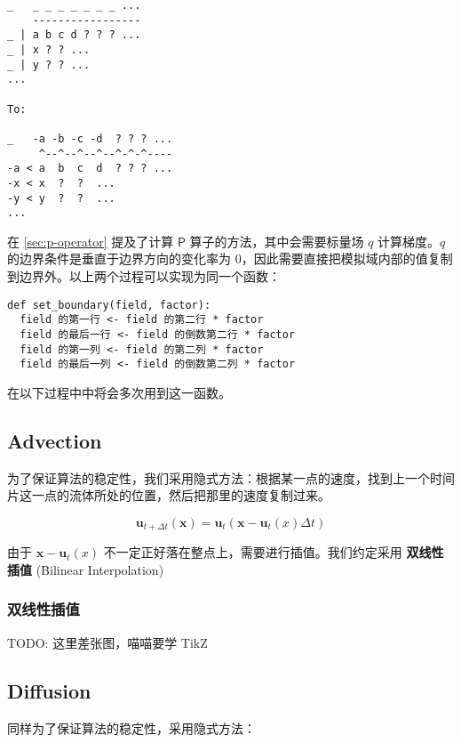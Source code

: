 \documentclass{ctexart}
\begin{document}
\begin{verbatim}
_   _ _ _ _ _ _ _ ...
    -----------------
_ | a b c d ? ? ? ...
_ | x ? ? ...
_ | y ? ? ...
...

To:

_   -a -b -c -d  ? ? ? ...
     ^--^--^--^--^-^-^----
-a < a  b  c  d  ? ? ? ...
-x < x  ?  ?  ...
-y < y  ?  ?  ...
...

\end{verbatim}

在 \ref{sec:p-operator} 提及了计算 $\mathsf{P}$ 算子的方法，其中会需要标量场 $q$ 计算梯度。$q$ 的边界条件是垂直于边界方向的变化率为 0，因此需要直接把模拟域内部的值复制到边界外。以上两个过程可以实现为同一个函数：

\begin{verbatim}
def set_boundary(field, factor):
  field 的第一行 <- field 的第二行 * factor
  field 的最后一行 <- field 的倒数第二行 * factor
  field 的第一列 <- field 的第二列 * factor
  field 的最后一列 <- field 的倒数第二列 * factor
\end{verbatim}

在以下过程中中将会多次用到这一函数。

\subsection{Advection}

为了保证算法的稳定性，我们采用隐式方法：根据某一点的速度，找到上一个时间片这一点的流体所处的位置，然后把那里的速度复制过来。

\begin{equation}
\mathbf{u}_{t + \Delta t}(\mathbf{x}) = \mathbf{u}_t(\mathbf{x} - \mathbf{u}_t(x) \Delta t)
\end{equation}

由于 $\mathbf{x} - \mathbf{u}_t(x)$ 不一定正好落在整点上，需要进行插值。我们约定采用 \textbf{双线性插值} (Bilinear Interpolation)

\subsubsection{双线性插值}

TODO: 这里差张图，喵喵要学 TikZ

\subsection{Diffusion}

同样为了保证算法的稳定性，采用隐式方法：
\end{document}
